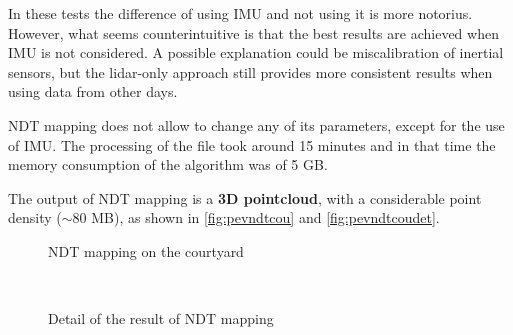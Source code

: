 \clearpage
In these tests the difference of using IMU and not using it is more notorius. However, what seems counterintuitive is that the best results are achieved when IMU is not considered. A possible explanation could be miscalibration of inertial sensors, but the lidar-only approach still provides more consistent results when using data from other days.

 NDT mapping does not allow to change any of its parameters, except for the use of IMU. The processing of the file took around 15 minutes and in that time the memory consumption of the algorithm was of 5 GB.

The output of NDT mapping is a \textbf{3D pointcloud}, with a considerable point density ($\sim$80 MB), as shown in \autoref{fig:pevndtcou} and \autoref{fig:pevndtcoudet}. 
\begin{figure}[htb]
  \centering
  \caption{NDT mapping on the courtyard}
  \label{fig:pevndtcou}
\end{figure}

\begin{figure}[h!]
  \centering
   \\
  \caption{Detail of the result of NDT mapping}
  \label{fig:pevndtcoudet}
\end{figure}

